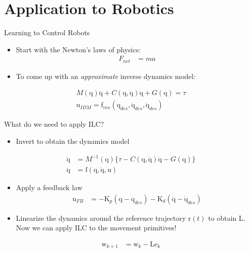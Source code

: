 \documentclass[handout]{beamer}
\newcommand{\boldvec}[1]{\boldsymbol{\mathrm{#1}}}
\let\vec\boldvec
\newcommand{\joint}{\vec{q}} %
\newcommand{\error}{\vec{e}} %
\newcommand{\traj}{\vec{r}} %
\newcommand{\sysInput}{\vec{u}} %
\newcommand{\weights}{\vec{w}} %
\newcommand{\lmatrix}{\vec{L}} %
\begin{document}
\section{Application to Robotics}
%
\begin{frame}{Learning to Control Robots}
\begin{itemize}
\item Start with the Newton's laws of physics:
\begin{equation*}
\begin{aligned}
F_{net} &= ma
\end{aligned}
\end{equation*}
\item To come up with an \emph{approximate} inverse dynamics model:
\end{itemize}
\begin{equation*}
\begin{aligned}
M(\joint)\ddot{\joint} + C(\joint,\dot{\joint})\dot{\joint} + G(\joint) = \tau \\
\sysInput_{IDM} = \vec{f}_{inv}(\joint_{des},\dot{\joint}_{des},\ddot{\joint}_{des})
\end{aligned}
\end{equation*}
\end{frame}
%
\begin{frame}{What do we need to apply ILC?}
\begin{itemize}
\item Invert to obtain the dynamics model
\end{itemize}
\begin{equation*}
\begin{aligned}
\ddot{\joint} &= M^{-1}(\joint)\{ \tau - C(\joint,\dot{\joint})\dot{\joint} - G(\joint) \}\\
\ddot{\joint} &= \vec{f}(\joint,\dot{\joint},\sysInput)
\end{aligned}
\end{equation*}
\begin{itemize}
\item Apply a feedback law
\begin{equation*}
\begin{aligned}
\sysInput_{FB} &= -\vec{K}_{p}(\joint - \joint_{des}) - \vec{K}_{d}(\dot{\joint} - \dot{\joint}_{des})
\end{aligned}
\end{equation*}
\item Linearize the dynamics around the reference trajectory $\traj(t)$ to obtain $\lmatrix$. Now we can apply ILC to the movement primitives!
\end{itemize}
\begin{equation*}
\begin{aligned}
\weights_{k+1} &= \weights_{k} - \lmatrix\error_{k}
\end{aligned}
\end{equation*}
\end{frame}
\end{document}
